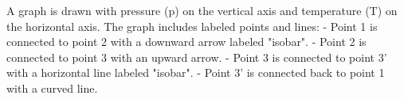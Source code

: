 A graph is drawn with pressure (p) on the vertical axis and temperature (T) on the horizontal axis. The graph includes labeled points and lines:  
- Point 1 is connected to point 2 with a downward arrow labeled "isobar".  
- Point 2 is connected to point 3 with an upward arrow.  
- Point 3 is connected to point 3' with a horizontal line labeled "isobar".  
- Point 3' is connected back to point 1 with a curved line.